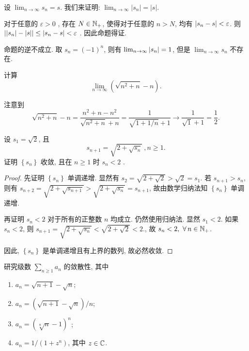 \documentclass{article}
\begin{document}
\begin{solution}
    设 \( \lim_{n\to\infty}s_n=s \). 我们来证明: \( \lim_{n\to\infty}|s_n|=|s| \). \par
    对于任意的 \( \varepsilon>0 \) , 存在 \( N\in \mathbb{N}_+ \), 使得对于任意的 \( n>N \), 均有 \( \left|s_n-s\right|<\varepsilon \). 则 \( \left|\left|s_n\right|-\left|s\right|\right|\le\left|s_n-s\right|<\varepsilon \) . 因此命题得证.\par
    命题的逆不成立. 取 \( s_n=(-1)^{n} \), 则有 \( \lim_{n\to\infty}\left|s_n\right|=1 \), 但是 \( \lim_{n\to\infty}s_n \) 不存在.
\end{solution}

\begin{problem}[3-2]
    计算
    \[ \lim_{n\to\infty}\left(\sqrt{n^2+n}-n\right). \] 
\end{problem}

\begin{solution}
    注意到
    \[ \sqrt{n^2+n}-n=\frac{n^2+n-n^2}{\sqrt{n^2+n}+n}=\frac{1}{\sqrt{1+1/n}+1}\to \frac{1}{\sqrt{1}+1}=\frac{1}{2}. \] 
\end{solution}

\begin{problem}[3-3]
    设 \( s_1=\sqrt{2} \), 且
    \[ s_{n+1}=\sqrt{2+\sqrt{s_n}}\ ,n\ge 1. \] 
    证明 \( \left\{s_n\right\} \) 收敛, 且在 \( n\ge 1 \) 时 \( s_n<2 \) .
\end{problem}

\begin{proof}
    先证明 \( \left\{s_n\right\} \) 单调递增. 显然有 \( s_2=\sqrt{2+\sqrt{2}}>\sqrt{2}=s_1 \). 若 \( s_{n+1}>s_n \), 则有 \( s_{n+2}=\sqrt{2+\sqrt{s_{n+1}}}>\sqrt{2+\sqrt{s_{n}}}=s_{n+1} \), 故由数学归纳法知 \( \left\{s_n\right\} \) 单调递增. \par
    再证明 \( s_n<2 \) 对于所有的正整数 \( n \) 均成立. 仍然使用归纳法. 显然 \( s_1<2 \). 如果 \( s_n<2 \), 则 \( s_{n+1}=\sqrt{2+\sqrt{s_{n}}}<\sqrt{2+\sqrt{2}}<2. \), 故 \( s_n<2,\ \forall\,n\in\mathbb{N}_+ \).\par
    因此, \( \left\{s_n\right\} \) 是单调递增且有上界的数列, 故必然收敛.
\end{proof}

\begin{problem}[3-6]
    研究级数 \( \sum_{n\ge 1}a_n \) 的敛散性, 其中
    \begin{enumerate}[label=(\alph*)]
        \item \( a_n=\sqrt{n+1}-\sqrt{n} \); 
        \item \( a_n=\left(\sqrt{n+1}-\sqrt{n}\right)/n \);
        \item \( a_n=\left(\sqrt[n]{n}-1\right)^n \);
        \item \( a_n=1/\left(1+z^n\right) \), 其中 \( z\in\mathbb{C} \).
    \end{enumerate}
\end{problem}
\end{document}
